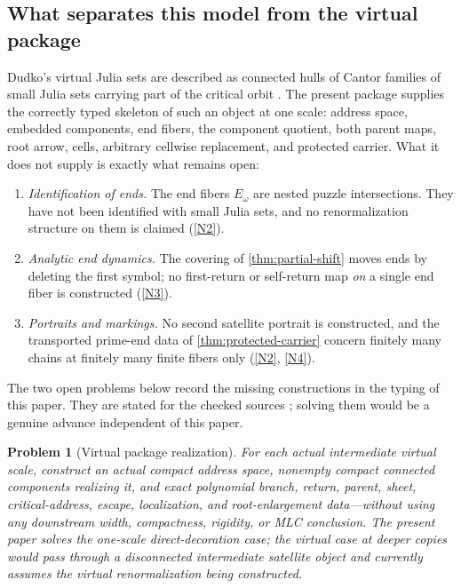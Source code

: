 \documentclass[11pt,reqno]{amsart}
\numberwithin{equation}{section}
\theoremstyle{plain}
\newtheorem{problem}[theorem]{Problem}
\theoremstyle{definition}
\theoremstyle{remark}
\begin{document}
\subsection{What separates this model from the virtual package}

Dudko's virtual Julia sets are described as connected hulls of Cantor
families of small Julia sets carrying part of the critical orbit
\cite{Dudko25}.  The present package supplies the correctly typed
skeleton of such an object at one scale: address space, embedded
components, end fibers, the component quotient, both parent maps, root
arrow, cells, arbitrary cellwise replacement, and protected carrier.
What it does not supply is exactly what remains open:

\begin{enumerate}[label=(\alph*),leftmargin=2.4em]
 \item \emph{Identification of ends.}  The end fibers $E_\omega$ are
  nested puzzle intersections.  They have not been identified with
  small Julia sets, and no renormalization structure on them is
  claimed (\ref{N2}).
 \item \emph{Analytic end dynamics.}  The covering of
  \cref{thm:partial-shift} moves ends by deleting the first symbol; no
  first-return or self-return map \emph{on} a single end fiber is
  constructed (\ref{N3}).
 \item \emph{Portraits and markings.}  No second satellite portrait is
  constructed, and the transported prime-end data of
  \cref{thm:protected-carrier} concern finitely many chains at finitely
  many finite fibers only (\ref{N2}, \ref{N4}).
\end{enumerate}

The two open problems below record the missing constructions in the
typing of this paper.  They are stated for the checked sources
\cite{Dudko25,KKL26}; solving them would be a genuine advance
independent of this paper.

\begin{problem}[Virtual package realization]
\label{prob:virtual-package}
For each actual intermediate virtual scale, construct an actual compact
address space, nonempty compact connected components realizing it, and
exact polynomial branch, return, parent, sheet, critical-address,
escape, localization, and root-enlargement data---without using any
downstream width, compactness, rigidity, or MLC conclusion.  The present
paper solves the one-scale direct-decoration case; the virtual case at
deeper copies would pass through a disconnected intermediate satellite
object and currently assumes the virtual renormalization being
constructed.
\end{problem}
\end{document}
